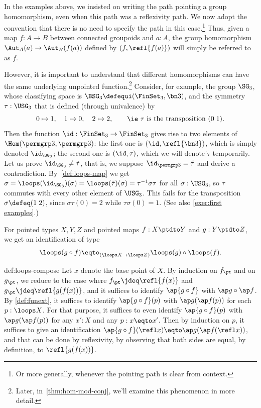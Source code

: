 \begin{remark}
  In the examples above, we insisted on writing the path pointing a group
  homomorphism, even when this path was a reflexivity path. We now adopt
  the convention that there is no need to specify the path in this case.\footnote{%
    Or more generally, whenever the pointing path is clear from context.}
  Thus, given a
  map $f:A \to B$ between connected groupoids and $a:A$, the group
  homomorphism $\Aut_A(a) \to \Aut_B(f(a))$ defined by
  $(f,\refl{f(a)})$ will simply be referred to as $f$.

  However, it is important to understand that different homomorphisms
  can have the same underlying unpointed function.\footnote{%
    Later, in~\cref{thm:hom-mod-conj}, we'll examine this phenomenon in more detail.}
  Consider, for
  example, the group $\SG_3$, whose classifying space is
  $\BSG_3\defequi (\FinSet_3,\bn 3)$, and the symmetry
  $\tau:\USG_3$ that is defined (through
  univalence) by
  \[
    0\mapsto 1,\quad 1\mapsto 0,\quad 2 \mapsto 2, \qquad
    \text{\ie $\tau$ is the transposition $(0\; 1)$.}
  \]
  Then the function $\id: \FinSet_3 \to \FinSet_3$ gives rise to two
  elements of $\Hom(\permgrp 3,\permgrp 3)$: the first one is
  $(\id,\refl{\bn 3})$, which is simply denoted $\id_{\SG_3}$;
  the second one is $(\id,\tau)$, which we will denote $\tilde\tau$
  temporarily. Let us prove $\id_{\SG_3} \neq \tilde \tau$, that
  is, we suppose $\id_{\permgrp 3} = \tilde \tau$
  and derive a
  contradiction. By~\cref{def:loops-map} we get
  $\sigma = \loops(\id_{\SG_3})(\sigma) = \loops(\tilde \tau)(\sigma) 
          = \tau^{-1} \sigma \tau$ for all $\sigma : \USG_3$,
  so $\tau$ commutes with every other element of
  $\USG_3$. This fails for the transposition $\sigma \defeq (1\;2)$,
  since $\sigma\tau(0) = 2$ while $\tau\sigma(0) = 1$. (See also
  \cref{exer:first examples}.)
\end{remark}

\begin{construction}\label{def:loops-compose}
  For pointed types $X,Y,Z$ and pointed maps $f : X \ptdto Y$
  and $g : Y \ptdto Z$, we get an identification of type
  \[
    \loops(g \circ f) \eqto_{(\loops X \to \loops Z)}
    \loops(g) \circ \loops(f).
  \]
\end{construction}

\begin{implementation}{def:loops-compose}
  Let $x$ denote the base point of $X$.
  By induction on $f_\pt$ and on $g_\pt$, we reduce to the case where $f_\pt \jdeq \refl{f(x)}$
  and $g_\pt \jdeq \refl{g(f(x))}$, and it suffices to identify $\ap{g \circ f}$ with $\ap g \circ \ap f$.
  By \cref{def:funext}, it suffices to identify $\ap{g \circ f}(p)$ with $\ap g ( \ap f (p))$ for each $p : \loops X$.
  For that purpose, it suffices to even identify $\ap{g \circ f}(p)$ with $\ap g ( \ap f (p))$ for any $x' : X$ and any $p : x \eqto x'$.
  Then by induction on $p$, it suffices to give an identification
  $\ap{g \circ f}(\refl x) \eqto \ap g ( \ap f (\refl x))$, and that can
  be done by reflexivity,
  by observing that both sides are equal, by definition, to $\refl{g(f(x))}$.
\end{implementation}

